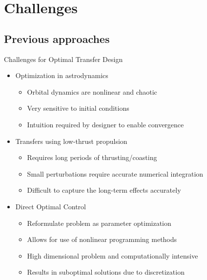
\section*{Challenges}
\subsection*{Previous approaches}

\begin{frame}{Challenges for Optimal Transfer Design} %

\begin{itemize}
    \item Optimization in astrodynamics
        \begin{itemize}
            \item Orbital dynamics are nonlinear and chaotic
            \item Very sensitive to initial conditions
            \item Intuition required by designer to enable convergence
        \end{itemize}
    \pause
    \item Transfers using low-thrust propulsion
        \begin{itemize}
            \item Requires long periods of thrusting/coasting
            \item Small perturbations require accurate numerical integration
            \item Difficult to capture the long-term effects accurately
        \end{itemize}
    \pause
    \item Direct Optimal Control
        \begin{itemize}
            \item Reformulate problem as parameter optimization
            \item Allows for use of nonlinear programming methods
            \item High dimensional problem and computationally intensive
            \item Results in suboptimal solutions due to discretization
        \end{itemize}
\end{itemize}
\end{frame}   %

